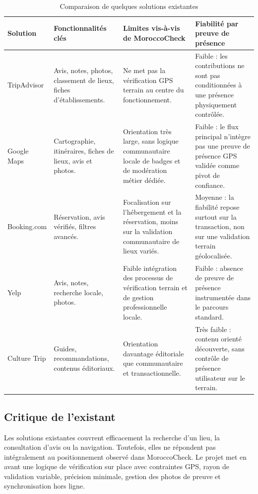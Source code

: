 ﻿\documentclass[12pt,a4paper]{report}
\begin{document}
\begin{table}[H]
\centering
\caption{Comparaison de quelques solutions existantes}
\begin{tabularx}{\textwidth}{p{2.2cm}p{3.2cm}Y p{2.7cm}}
\toprule
\textbf{Solution} & \textbf{Fonctionnalit\'es cl\'es} & \textbf{Limites vis-\`a-vis de MoroccoCheck} & \textbf{Fiabilit\'e par preuve de pr\'esence} \\
\midrule
TripAdvisor & Avis, notes, photos, classement de lieux, fiches d'\'etablissements. & Ne met pas la v\'erification GPS terrain au centre du fonctionnement. & Faible : les contributions ne sont pas conditionn\'ees \`a une pr\'esence physiquement contr\^ol\'ee. \\
Google Maps & Cartographie, itin\'eraires, fiches de lieux, avis et photos. & Orientation tr\`es large, sans logique communautaire locale de badges et de mod\'eration m\'etier d\'edi\'ee. & Faible : le flux principal n'int\`egre pas une preuve de pr\'esence GPS valid\'ee comme pivot de confiance. \\
Booking.com & R\'eservation, avis v\'erifi\'es, filtres avanc\'es. & Focalisation sur l'h\'ebergement et la r\'eservation, moins sur la validation communautaire de lieux vari\'es. & Moyenne : la fiabilit\'e repose surtout sur la transaction, non sur une validation terrain g\'eolocalis\'ee. \\
Yelp & Avis, notes, recherche locale, photos. & Faible int\'egration des processus de v\'erification terrain et de gestion professionnelle locale. & Faible : absence de preuve de pr\'esence instrument\'ee dans le parcours standard. \\
Culture Trip & Guides, recommandations, contenus \'editoriaux. & Orientation davantage \'editoriale que communautaire et transactionnelle. & Tr\`es faible : contenu orient\'e d\'ecouverte, sans contr\^ole de pr\'esence utilisateur sur le terrain. \\
\bottomrule
\end{tabularx}
\end{table}

\subsection{Critique de l'existant}
Les solutions existantes couvrent efficacement la recherche d'un lieu, la consultation d'avis ou la navigation. Toutefois, elles ne r\'epondent pas int\'egralement au positionnement observ\'e dans MoroccoCheck. Le projet met en avant une logique de v\'erification sur place avec contraintes GPS, rayon de validation variable, pr\'ecision minimale, gestion des photos de preuve et synchronisation hors ligne.
\end{document}
